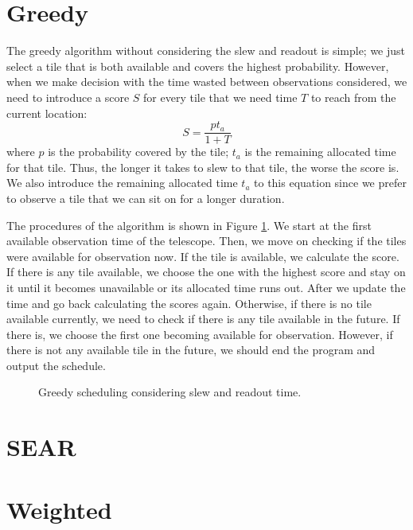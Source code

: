 \documentclass{article}
\begin{document}
\section{Greedy}
The greedy algorithm without considering the slew and readout is simple; we just select a tile that is both available and covers the highest probability. However, when we make decision with the time wasted between observations considered, we need to introduce a score $S$ for every tile that we need time $T$ to reach from the current location:
\begin{equation}
S = \frac{pt_a}{1+T}
\end{equation}
where $p$ is the probability covered by the tile; $t_a$ is the remaining allocated time for that tile. Thus, the longer it takes to slew to that tile, the worse the score is. We also introduce the remaining allocated time $t_a$ to this equation since we prefer to observe a tile that we can sit on for a longer duration.

The procedures of the algorithm is shown in Figure \ref{fig:greedy_slew}. We start at the first available observation time of the telescope. Then, we move on checking if the tiles were available for observation now. If the tile is available, we calculate the score. If there is any tile available, we choose the one with the highest score and stay on it until it becomes unavailable or its allocated time runs out. After we update the time and go back calculating the scores again. Otherwise, if there is no tile available currently, we need to check if there is any tile available in the future. If there is, we choose the first one becoming available for observation. However, if there is not any available tile in the future, we should end the program and output the schedule.
\begin{figure}[t]
\centering
{}
\caption{Greedy scheduling considering slew and readout time.}
\label{fig:greedy_slew}
\end{figure}
\section{SEAR}
\section{Weighted}
\end{document}
